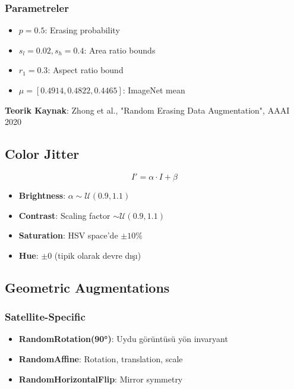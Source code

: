 \documentclass[12pt,a4paper]{article}
\begin{document}
\subsubsection{Parametreler}
\begin{itemize}
    \item $p = 0.5$: Erasing probability
    \item $s_l = 0.02, s_h = 0.4$: Area ratio bounds
    \item $r_1 = 0.3$: Aspect ratio bound
    \item $\mu = [0.4914, 0.4822, 0.4465]$: ImageNet mean
\end{itemize}

\textbf{Teorik Kaynak}: Zhong et al., "Random Erasing Data Augmentation", AAAI 2020

\subsection{Color Jitter}

\begin{equation}
    I' = \alpha \cdot I + \beta
\end{equation}

\begin{itemize}
    \item \textbf{Brightness}: $\alpha \sim \mathcal{U}(0.9, 1.1)$
    \item \textbf{Contrast}: Scaling factor $\sim \mathcal{U}(0.9, 1.1)$
    \item \textbf{Saturation}: HSV space'de $\pm 10\%$
    \item \textbf{Hue}: $\pm 0$ (tipik olarak devre dışı)
\end{itemize}

\subsection{Geometric Augmentations}

\subsubsection{Satellite-Specific}
\begin{itemize}
    \item \textbf{RandomRotation(90°)}: Uydu görüntüsü yön invaryant
    \item \textbf{RandomAffine}: Rotation, translation, scale
    \item \textbf{RandomHorizontalFlip}: Mirror symmetry
\end{itemize}
\end{document}
